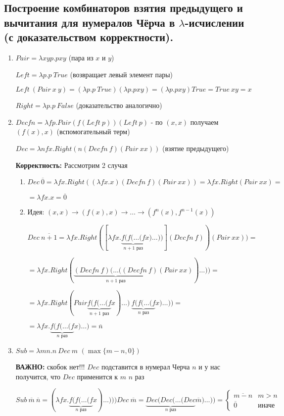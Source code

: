 \subsection{Построение комбинаторов взятия предыдущего и вычитания для нумералов Чёрча в $\lambda$-исчислении (с доказательством корректности).}
\begin{enumerate}
 \item $Pair=\lambda xyp.pxy$ (пара из $x$ и $y$)
    \par $Left=\lambda p.p \: True$ (возвращает левый элемент пары)
    \par $Left \: (Pair \: x \: y)=(\lambda p.p \: True)(\lambda p.pxy)=(\lambda p.pxy)True=True \: xy=x$
    \par $Right=\lambda p.p\:False$ (доказательство аналогично)
    \item $Decfn=\lambda fp.Pair(f(Left \: p))(Left \: p)$ - по $(x,x)$ получаем $(f(x),x)$ (вспомогательный терм)
    \par $Dec=\lambda nfx.Right(n(Decfn \: f)(Pair \: xx))$ (взятие предыдущего)%
    \par \textbf{Корректность:} Рассмотрим 2 случая \begin{enumerate}
        \item $Dec \: \overline{0}=\lambda fx.Right((\lambda fx.x)(Decfn \: f)(Pair \: xx))=\lambda fx.Right(Pair \: xx)=$ \par $=\lambda fx.x=\overline{0}$
        \item Идея: $(x,x) \rightarrow (f(x), x) \rightarrow \ldots \rightarrow (f^n(x), f^{n-1}(x))$
        \par $Dec \: \overline{n+1}=\lambda fx.Right([\lambda fx.\underbrace{f(f(\ldots(f}_\text{$n+1$ раз}x)\ldots))](Decfn \: f))(Pair \: xx))=$ \par$=\lambda fx.Right(\underbrace{(Decfn \: f)(\ldots((Decfn \: f)}_\text{$n+1$ раз}(Pair \: xx))\ldots))=$ \par $=\lambda fx.Right(Pair \underbrace{f(f(\ldots(f}_\text{$n+1$ раз}x)\ldots) \: \underbrace{f(f(\ldots(f}_\text{$n$ раз}x)\ldots))=$ \par $=\lambda fx.\underbrace{f(f(\ldots(f}_\text{$n$ раз}x)\ldots)=\overline{n}$
    \end{enumerate}
    \item $Sub=\lambda mn.n \: Dec \: m$ $(\max\{m-n,0\})$
    \par \textbf{ВАЖНО:} скобок нет!!! $Dec$ подставится в нумерал Черча $n$ и у нас получится, что $Dec$ применится к $m$ $n$ раз
    \par $Sub \: \overline{m} \: \overline{n}=(\lambda fx.\underbrace{f(f(\ldots(f}_\text{$n$ раз}x)\ldots)))Dec \: \overline{m}=\underbrace{Dec(Dec(\ldots(Dec}_\text{$n$ раз}\overline{m})\ldots))=\begin{cases}
    \overline{m-n} & m > n\\
    \overline{0} & \text{иначе}
    \end{cases}$
\end{enumerate}